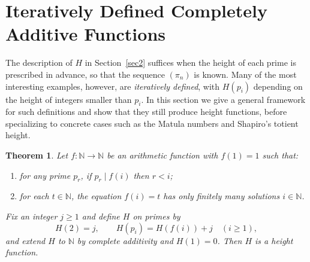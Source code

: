 \documentclass[11pt]{article}
\newtheorem{theorem}{Theorem}
\theoremstyle{definition}
\begin{document}
\section{Iteratively Defined Completely Additive Functions}
\label{sec3}

The description of $H$ in Section~\ref{sec2} suffices when the height
of each prime is prescribed in advance, so that the sequence
$(\pi_n)$ is known.  Many of the most interesting examples, however,
are \emph{iteratively defined}, with $H(p_i)$ depending on the height
of integers smaller than $p_i$.  In this section we give a general
framework for such definitions and show that they still produce height
functions, before specializing to concrete cases such as the Matula
numbers and Shapiro's totient height.


\begin{theorem}\label{thm:iterative}
Let $f:\mathbb{N}\to\mathbb{N}$ be an arithmetic function with
$f(1)=1$ such that:
\begin{enumerate}
\item for any prime $p_r$, if $p_r\mid f(i)$ then $r<i$;
\item for each $t\in\mathbb{N}$, the equation $f(i)=t$ has only
  finitely many solutions $i\in\mathbb{N}$.
\end{enumerate}
Fix an integer $j\ge1$ and define $H$ on primes by
\[
  H(2)=j,\qquad H(p_i) = H(f(i)) + j \quad (i\ge1),
\]
and extend $H$ to $\mathbb{N}$ by complete additivity and $H(1)=0$.
Then $H$ is a height function.
\end{theorem}
\end{document}

